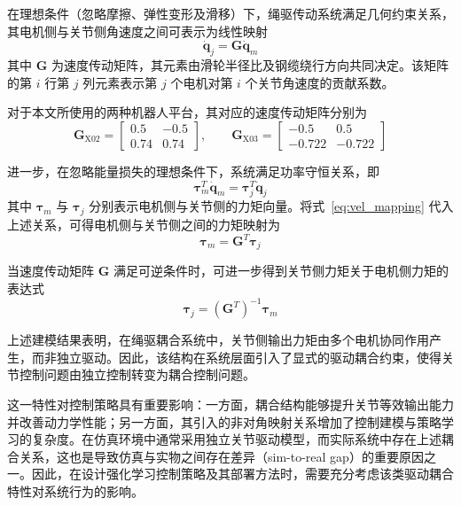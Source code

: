 在理想条件（忽略摩擦、弹性变形及滑移）下，绳驱传动系统满足几何约束关系，其电机侧与关节侧角速度之间可表示为线性映射
\begin{equation}
	\dot{\boldsymbol q}_j = \mathbf G \dot{\boldsymbol q}_m
	\label{eq:vel_mapping}
\end{equation}
其中 $\mathbf G$ 为速度传动矩阵，其元素由滑轮半径比及钢缆绕行方向共同决定。该矩阵的第 $i$ 行第 $j$ 列元素表示第 $j$ 个电机对第 $i$ 个关节角速度的贡献系数。

对于本文所使用的两种机器人平台，其对应的速度传动矩阵分别为
\begin{equation}
	\mathbf G_{\mathrm{X02}}=
	\begin{bmatrix}
		0.5 & -0.5\\
		0.74 & 0.74
	\end{bmatrix},
	\qquad
	\mathbf G_{\mathrm{X03}}=
	\begin{bmatrix}
		-0.5 & 0.5\\
		-0.722 & -0.722
	\end{bmatrix}
\end{equation}

进一步，在忽略能量损失的理想条件下，系统满足功率守恒关系，即
\begin{equation}
	\boldsymbol\tau_m^T \dot{\boldsymbol q}_m = \boldsymbol\tau_j^T \dot{\boldsymbol q}_j
\end{equation}
其中 $\boldsymbol\tau_m$ 与 $\boldsymbol\tau_j$ 分别表示电机侧与关节侧的力矩向量。将式~\eqref{eq:vel_mapping} 代入上述关系，可得电机侧与关节侧之间的力矩映射为
\begin{equation}
	\boldsymbol\tau_m = \mathbf G^T \boldsymbol\tau_j
	\label{eq:torque_mapping_motor}
\end{equation}

当速度传动矩阵 $\mathbf G$ 满足可逆条件时，可进一步得到关节侧力矩关于电机侧力矩的表达式
\begin{equation}
	\boldsymbol\tau_j = (\mathbf G^T)^{-1} \boldsymbol\tau_m
	\label{eq:torque_mapping_joint}
\end{equation}

上述建模结果表明，在绳驱耦合系统中，关节侧输出力矩由多个电机协同作用产生，而非独立驱动。因此，该结构在系统层面引入了显式的驱动耦合约束，使得关节控制问题由独立控制转变为耦合控制问题。

这一特性对控制策略具有重要影响：一方面，耦合结构能够提升关节等效输出能力并改善动力学性能；另一方面，其引入的非对角映射关系增加了控制建模与策略学习的复杂度。在仿真环境中通常采用独立关节驱动模型，而实际系统中存在上述耦合关系，这也是导致仿真与实物之间存在差异（sim-to-real gap）的重要原因之一。因此，在设计强化学习控制策略及其部署方法时，需要充分考虑该类驱动耦合特性对系统行为的影响。

